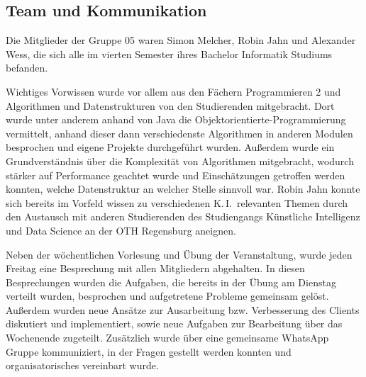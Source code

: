 \documentclass[12pt,a4paper,bibliography=totocnumbered,listof=totocnumbered]{article}
\begin{document}
\subsection{Team und Kommunikation}
Die Mitglieder der Gruppe 05 waren Simon Melcher, Robin Jahn und Alexander Wess, die sich alle im vierten Semester ihres Bachelor Informatik Studiums befanden.

Wichtiges Vorwissen wurde vor allem aus den Fächern Programmieren 2 und Algorithmen und Datenstrukturen von den Studierenden mitgebracht. Dort wurde unter anderem anhand von Java die Objektorientierte-Programmierung vermittelt, anhand dieser dann verschiedenste Algorithmen in anderen Modulen besprochen und eigene Projekte durchgeführt wurden. Außerdem wurde ein Grundverständnis über die Komplexität von Algorithmen mitgebracht, wodurch stärker auf Performance geachtet wurde und Einschätzungen getroffen werden konnten, welche Datenstruktur an welcher Stelle sinnvoll war. Robin Jahn konnte sich bereits im Vorfeld wissen zu verschiedenen K.\,I.\ relevanten Themen durch den Austausch mit anderen Studierenden des Studiengangs \glqq Künstliche Intelligenz und Data Science\grqq{} an der OTH Regensburg aneignen.

Neben der wöchentlichen Vorlesung und Übung der Veranstaltung, wurde jeden Freitag eine Besprechung mit allen Mitgliedern abgehalten. In diesen Besprechungen wurden die Aufgaben, die bereits in der Übung am Dienstag verteilt wurden, besprochen und aufgetretene Probleme gemeinsam gelöst. Außerdem wurden neue Ansätze zur Ausarbeitung bzw. Verbesserung des Clients diskutiert und implementiert, sowie neue Aufgaben zur Bearbeitung über das Wochenende zugeteilt. Zusätzlich wurde über eine gemeinsame WhatsApp Gruppe kommuniziert, in der Fragen gestellt werden konnten und organisatorisches vereinbart wurde.

\newpage
\end{document}
